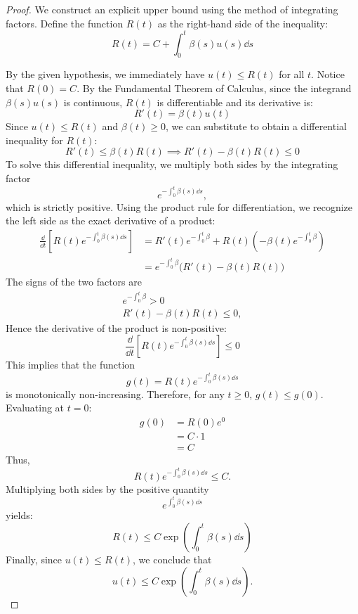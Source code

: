 \begin{proof}
We construct an explicit upper bound using the method of integrating factors.
Define the function $R(t)$ as the right-hand side of the inequality:
\begin{equation}
R(t) = C + \int_0^t \beta(s) u(s) \dd s
\end{equation}

By the given hypothesis, we immediately have $u(t) \leq R(t)$ for all $t$.
Notice that $R(0) = C$. By the Fundamental Theorem of Calculus, since the integrand $\beta(s)u(s)$ is continuous, $R(t)$ is differentiable and its derivative is:
\begin{equation}
R'(t) = \beta(t) u(t)
\end{equation}
Since $u(t) \leq R(t)$ and $\beta(t) \geq 0$, we can substitute to obtain a differential inequality for $R(t)$:
\begin{equation}
R'(t) \leq \beta(t) R(t) \implies R'(t) - \beta(t) R(t) \leq 0
\end{equation}
To solve this differential inequality, we multiply both sides by the integrating factor \[
e^{-\int_0^t \beta(s) \dd s},
\] which is strictly positive. Using the product rule for differentiation, we recognize the left side as the exact derivative of a product:
\begin{equation}
\begin{aligned}
\frac{\dd}{\dd t} \left[ R(t) e^{-\int_0^t \beta(s) \dd s} \right] &= R'(t) e^{-\int_0^t \beta} + R(t) \left( -\beta(t) e^{-\int_0^t \beta} \right) \\
&= e^{-\int_0^t \beta} \Big( R'(t) - \beta(t) R(t) \Big)
\end{aligned}
\end{equation}
The signs of the two factors are
\[
\begin{gathered}
e^{-\int_0^t \beta} > 0 \\
R'(t) - \beta(t) R(t) \leq 0,
\end{gathered}
\]
Hence the derivative of the product is non-positive:
\begin{equation}
\frac{\dd}{\dd t} \left[ R(t) e^{-\int_0^t \beta(s) \dd s} \right] \leq 0
\end{equation}
This implies that the function \[
g(t) = R(t) e^{-\int_0^t \beta(s) \dd s}
\] is monotonically non-increasing. Therefore, for any $t \geq 0$, $g(t) \leq g(0)$. Evaluating at $t=0$:
\begin{equation}
\begin{aligned}
g(0) &= R(0) e^0 \\
&= C \cdot 1 \\
&= C
\end{aligned}
\end{equation}
Thus,
\[
R(t) e^{-\int_0^t \beta(s) \dd s} \leq C.
\]
Multiplying both sides by the positive quantity \[
e^{\int_0^t \beta(s) \dd s}
\] yields:
\begin{equation}
R(t) \leq C \exp\left( \int_0^t \beta(s) \dd s \right)
\end{equation}
Finally, since $u(t) \leq R(t)$, we conclude that
\[
u(t) \leq C \exp\left( \int_0^t \beta(s) \dd s \right).
\]

\end{proof}

